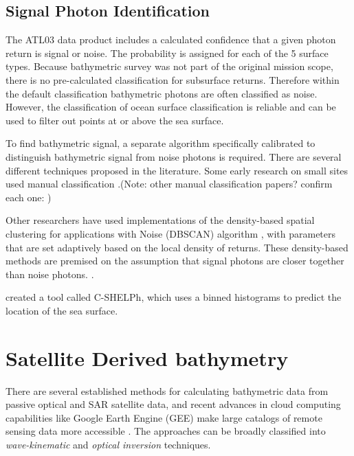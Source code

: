\subsection{Signal Photon Identification}
\label{subsec:denoising}
The ATL03 data product includes a calculated confidence that a given photon return is signal or noise. The probability is assigned for each of the 5 surface types. Because bathymetric survey was not part of the original mission scope, there is no pre-calculated classification for subsurface returns. Therefore within the default classification bathymetric photons are often classified as noise. However, the classification of ocean surface classification is reliable \parencite{}  and can be used to filter out points at or above the sea surface.

To find bathymetric signal, a separate algorithm specifically calibrated to distinguish bathymetric signal from noise photons is required. There are several different techniques proposed in the literature. Some early research on small sites used manual classification \parencite{Forfinski-Sarkozi2016}.(Note: other manual classification papers? confirm each one:
\cite{Thomas2021d}
\cite{Babbel2021a}
\cite{Albright2021})

Other researchers have used implementations of the density-based spatial clustering for applications with Noise (DBSCAN) algorithm \parencite{Ester1996}, with parameters that are set adaptively based on the local density of returns. These density-based methods are premised on the assumption that signal photons are closer together than noise photons. \parencite{Neuenschwander2019}.

\citeauthor{Thomas2022} created a tool called C-SHELPh, which uses a binned histograms to predict the location of the sea surface.

\section{Satellite Derived bathymetry}
There are several established methods for calculating bathymetric data from passive optical and SAR satellite data, and recent advances in cloud computing capabilities like Google Earth Engine (GEE) \parencite{Gorelick2017a} make large catalogs of remote sensing data more accessible \parencite{Pike2019,Turner2021}. The approaches can be broadly classified into \emph{wave-kinematic} and \emph{optical inversion} techniques.

